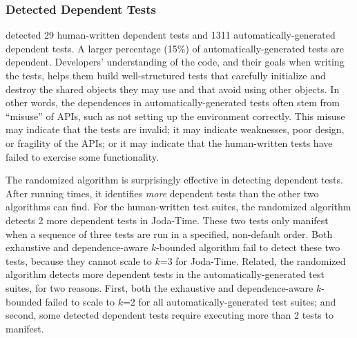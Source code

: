 \subsubsection{Detected Dependent Tests}
\label{sec:detectedtests}


\ourtool detected 29 human-written dependent tests and 1311
automatically-generated dependent tests.  A larger percentage (15\%) of
automatically-generated tests are dependent.  Developers' understanding of
the code, and their goals when writing the tests, helps them build
well-structured tests that carefully initialize and destroy the shared
objects they may use and that avoid using other objects.  In other words,
the dependences in automatically-generated tests often stem from ``misuse''
of APIs, such as not setting up the environment correctly.  This misuse may
indicate that the tests are invalid; it may indicate weaknesses, poor
design, or fragility of the APIs; or it may indicate that the human-written
tests have failed to exercise some functionality.






The randomized algorithm is surprisingly effective in
detecting dependent tests. After running \trialnum times,
it identifies \textit{more} dependent tests than the other
two algorithms can find. For the human-written
test suites, the randomized algorithm detects 2 more dependent
tests in Joda-Time. These two tests only
manifest when a sequence of three tests are run in a specified,
non-default order. Both exhaustive and dependence-aware $k$-bounded
algorithm fail to detect these two tests, because
they cannot scale to $k$=3 for 
Joda-Time. Related, the randomized algorithm
detects more dependent
tests in the automatically-generated test suites, for
two reasons. First,
both the exhaustive and dependence-aware $k$-bounded
failed to scale to $k$=2 for all automatically-generated test suites;
and second, some detected dependent tests require executing more than 2 tests
to manifest.

